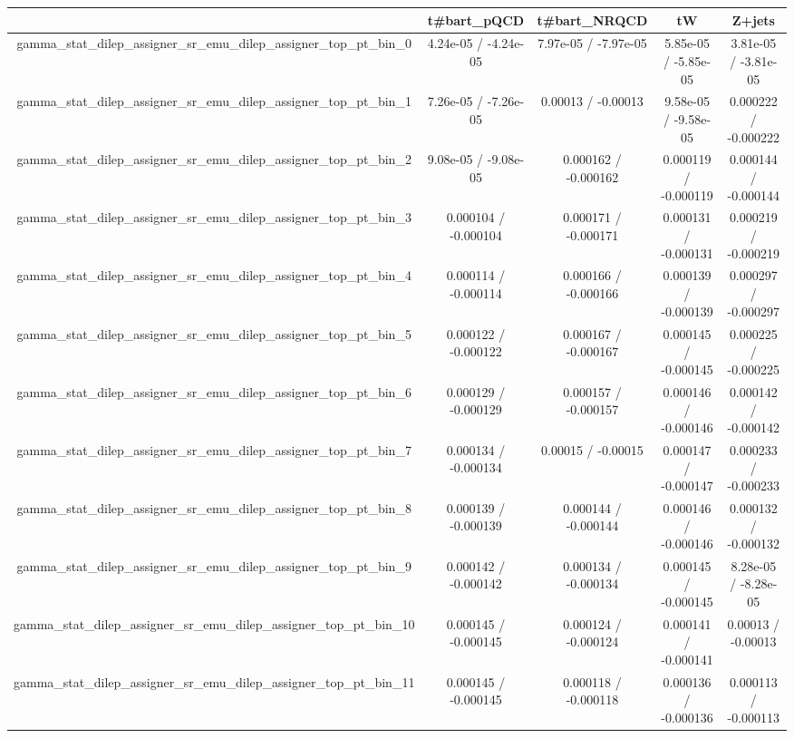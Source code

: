 \documentclass[10pt]{article}
\begin{document}
\begin{table}[htbp]
\begin{center}
\begin{tabular}{|c|c|c|c|c|}
\hline 
      & t#bar{t}_{pQCD}      & t#bar{t}_{NRQCD}      & tW      & Z+jets \\ 
\hline 
  gamma_stat_dilep_assigner_sr_emu_dilep_assigner_top_pt_bin_0 & 4.24e-05 / -4.24e-05 & 7.97e-05 / -7.97e-05 & 5.85e-05 / -5.85e-05 & 3.81e-05 / -3.81e-05 \\ 
  gamma_stat_dilep_assigner_sr_emu_dilep_assigner_top_pt_bin_1 & 7.26e-05 / -7.26e-05 & 0.00013 / -0.00013 & 9.58e-05 / -9.58e-05 & 0.000222 / -0.000222 \\ 
  gamma_stat_dilep_assigner_sr_emu_dilep_assigner_top_pt_bin_2 & 9.08e-05 / -9.08e-05 & 0.000162 / -0.000162 & 0.000119 / -0.000119 & 0.000144 / -0.000144 \\ 
  gamma_stat_dilep_assigner_sr_emu_dilep_assigner_top_pt_bin_3 & 0.000104 / -0.000104 & 0.000171 / -0.000171 & 0.000131 / -0.000131 & 0.000219 / -0.000219 \\ 
  gamma_stat_dilep_assigner_sr_emu_dilep_assigner_top_pt_bin_4 & 0.000114 / -0.000114 & 0.000166 / -0.000166 & 0.000139 / -0.000139 & 0.000297 / -0.000297 \\ 
  gamma_stat_dilep_assigner_sr_emu_dilep_assigner_top_pt_bin_5 & 0.000122 / -0.000122 & 0.000167 / -0.000167 & 0.000145 / -0.000145 & 0.000225 / -0.000225 \\ 
  gamma_stat_dilep_assigner_sr_emu_dilep_assigner_top_pt_bin_6 & 0.000129 / -0.000129 & 0.000157 / -0.000157 & 0.000146 / -0.000146 & 0.000142 / -0.000142 \\ 
  gamma_stat_dilep_assigner_sr_emu_dilep_assigner_top_pt_bin_7 & 0.000134 / -0.000134 & 0.00015 / -0.00015 & 0.000147 / -0.000147 & 0.000233 / -0.000233 \\ 
  gamma_stat_dilep_assigner_sr_emu_dilep_assigner_top_pt_bin_8 & 0.000139 / -0.000139 & 0.000144 / -0.000144 & 0.000146 / -0.000146 & 0.000132 / -0.000132 \\ 
  gamma_stat_dilep_assigner_sr_emu_dilep_assigner_top_pt_bin_9 & 0.000142 / -0.000142 & 0.000134 / -0.000134 & 0.000145 / -0.000145 & 8.28e-05 / -8.28e-05 \\ 
  gamma_stat_dilep_assigner_sr_emu_dilep_assigner_top_pt_bin_10 & 0.000145 / -0.000145 & 0.000124 / -0.000124 & 0.000141 / -0.000141 & 0.00013 / -0.00013 \\ 
  gamma_stat_dilep_assigner_sr_emu_dilep_assigner_top_pt_bin_11 & 0.000145 / -0.000145 & 0.000118 / -0.000118 & 0.000136 / -0.000136 & 0.000113 / -0.000113 \\ 

\end{tabular}
\end{center}
\end{table}
\end{document}
